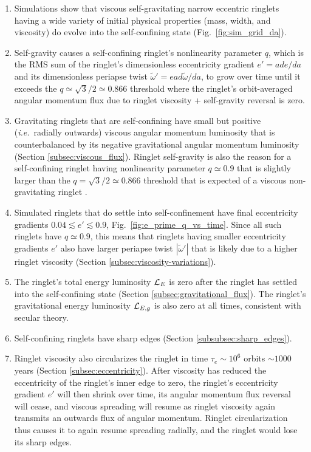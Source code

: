 \documentclass[preprint]{aastex62}
\begin{document}
\begin{enumerate}

\item Simulations show that viscous self-gravitating
narrow eccentric ringlets having a wide variety of initial 
physical properties (mass, width, and viscosity) do evolve
into the self-confining state (Fig.\ \ref{fig:sim_grid_da}).

\item Self-gravity causes a self-confining ringlet's nonlinearity parameter $q$, 
which is the RMS sum of the ringlet's dimensionless eccentricity gradient $e'=ade/da$ 
and its dimensionless periapse twist $\tilde{\omega}' = ead\tilde{\omega}/da$,
to grow over time until it exceeds the $q\simeq\sqrt{3}/2\simeq0.866$ threshold where 
the ringlet's orbit-averaged angular momentum flux due to ringlet viscosity + self-gravity reversal is zero.

\item Gravitating ringlets that are self-confining have small but positive 
({\it i.e.}\ radially outwards) viscous angular momentum luminosity
that is counterbalanced by its negative gravitational angular momentum luminosity
(Section \ref{subsec:viscous_flux}). Ringlet self-gravity is also the reason
for a self-confining ringlet having nonlinearity parameter $q\simeq0.9$
that is slightly larger than the $q = \sqrt{3}/2 \simeq 0.866$
threshold that is expected of a viscous non-gravitating ringlet
\citep{BGT82}.

\item Simulated ringlets that do settle into self-confinement have final eccentricity
gradients $0.04\lesssim e' \lesssim 0.9$, Fig.\ \ref{fig:e_prime_q_vs_time}. Since all such ringlets 
have $q\simeq0.9$, this means that ringlets having smaller eccentricity gradients $e'$
also have larger periapse twist $|\tilde{\omega}'|$ that is likely due to a higher 
ringlet viscosity (Section \ref{subsec:viscosity-variations}).

\item The ringlet's total energy luminosity ${\cal L}_{E}$ is zero after the ringlet has settled into
the self-confining state (Section \ref{subsec:gravitational_flux}). 
The ringlet's gravitational energy luminosity ${\cal L}_{E,g}$ is also
zero at all times, consistent with secular theory. 

\item Self-confining ringlets have sharp edges (Section \ref{subsubsec:sharp_edges}).

\item Ringlet viscosity also circularizes the ringlet in time $\tau_e\sim10^6$ orbits $\sim1000$ years
(Section \ref{subsec:eccentricity}). After viscosity has reduced the eccentricity of the ringlet's 
inner edge to zero, the ringlet's  eccentricity gradient $e'$ will then shrink over time, its
angular momentum flux reversal will cease, and viscous spreading will resume as ringlet 
viscosity again transmits an  outwards flux of angular momentum. Ringlet circularization thus causes 
it to again resume spreading radially, and the ringlet would lose its sharp edges.


\end{enumerate}
\end{document}
